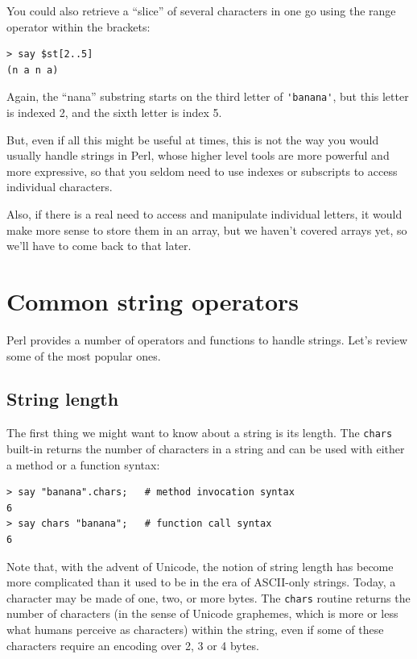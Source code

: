 You could also retrieve a ``slice'' of several characters in 
one go using the range operator within the brackets:

\begin{verbatim}
> say $st[2..5]
(n a n a)
\end{verbatim}
%
Again, the ``nana'' substring starts on the third letter of 
\verb"'banana'", but this letter is indexed 2, and the sixth letter is index 5. 

But, even if all this might be useful at times, this is 
not the way you would usually handle strings in Perl, 
whose higher level tools are more powerful and more 
expressive, so that you seldom need to use indexes or 
subscripts to access individual characters.

Also, if there is a real need to access and manipulate 
individual letters, it would make more sense to store 
them in an array, but we haven't covered arrays yet, so 
we'll have to come back to that later.


\section{Common string operators}

Perl provides a number of operators and functions to 
handle strings. Let's review some of the most popular ones.

\subsection{String length}

The first thing we might want to know about a string is its length. The {\tt chars} built-in returns the number of characters 
in a string and can be used with either a method or a function 
syntax:

\begin{verbatim}
> say "banana".chars;   # method invocation syntax
6
> say chars "banana";   # function call syntax
6
\end{verbatim}
%

Note that, with the advent of Unicode, the notion of 
string length has 
become more complicated than it used to be in the era
of ASCII-only strings. Today, a character may be made of one,
two, or more bytes. The {\tt chars} routine returns the 
number of characters (in the sense of Unicode graphemes, which
is more or less what humans perceive as characters) within 
the string, even if some of these characters require an 
encoding over 2, 3 or 4 bytes.

